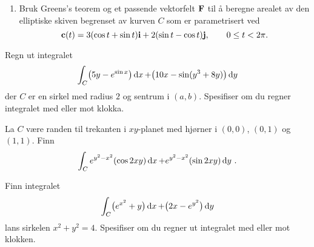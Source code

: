


\oppgave[V2017, Oppgave 6]

\begin{enumerate}
  \item Bruk Greens's teorem og et passende vektorfelt $\mathbf{F}$ til å beregne
    arealet av den elliptiske skiven begrenset av kurven $C$ som er
    parametrisert ved
    \begin{equation*}
      \mathbf{c}(t) = 3(\cos t + \sin t) \mathbf{i} + 2(\sin t - \cos t) \mathbf{j}, \qquad 0 \leq t < 2\pi.
    \end{equation*}
\end{enumerate}


\oppgave[V2014, Oppgave 5] Regn ut integralet
%
\begin{equation*}
  \int_C \bigl(5y - e^{\sin x}\bigr) \mathop{}\! \mathrm{d} x\mathop{}\! + \bigl(10x - \sin(y^3 + 8y)\bigr)\mathop{}\! \mathrm{d} y\mathop{}\!
\end{equation*}
%
der $C$ er en sirkel med radius $2$ og sentrum i $(a, b)$. Spesifiser om du
regner integralet med eller mot klokka.


\oppgave[K2013, Oppgave 6] La $C$ være randen til trekanten i $xy$-planet med
hjørner i $(0,0)$, $(0,1)$ og $(1,1)$. Finn
%
\begin{equation*}
  \int_C e^{y^2-x^2}(\cos 2xy)\mathop{}\! \mathrm{d} x\mathop{}\! + e^{y^2-x^2}(\sin 2xy) \mathop{}\! \mathrm{d} y\mathop{}\!\,.
\end{equation*}

\oppgave[V2012, Oppgave 9] Finn integralet
%
\begin{equation*}
  \int_C \bigl( e^{x^2} + y \bigr) \mathop{}\! \mathrm{d} x\mathop{}\! + \bigl( 2x - e^{y^2} \bigr) \mathop{}\! \mathrm{d} y\mathop{}\!
\end{equation*}
%
lans sirkelen $x^2 + y^2 = 4$. Spesifiser om du regner ut integralet med eller
mot klokken. 